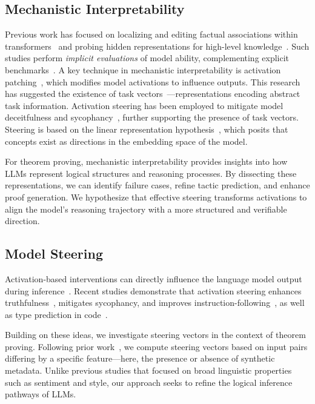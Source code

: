 \subsection{Mechanistic Interpretability}

Previous work has focused on localizing and editing factual associations within transformers~\citep{meng_locating_2022} and probing hidden representations for high-level knowledge~\citep{li2024inference,dong2023probing}. Such studies perform \emph{implicit evaluations} of model ability, complementing explicit benchmarks~\citep{dong2023probing}. A key technique in mechanistic interpretability is activation patching~\citep{vig2020causal,variengien2023look}, which modifies model activations to influence outputs. This research has suggested the existence of task vectors~\citep{hendel2023context, ilharco2022editing}—representations encoding abstract task information. Activation steering has been employed to mitigate model deceitfulness and sycophancy~\citep{rimsky2023steering, li2024inference}, further supporting the presence of task vectors. Steering is based on the linear representation hypothesis~\citep{park2023linear}, which posits that concepts exist as directions in the embedding space of the model. 

For theorem proving, mechanistic interpretability provides insights into how LLMs represent logical structures and reasoning processes. By dissecting these representations, we can identify failure cases, refine tactic prediction, and enhance proof generation. We hypothesize that effective steering transforms activations to align the model’s reasoning trajectory with a more structured and verifiable direction.

\subsection{Model Steering}
Activation-based interventions can directly influence the language model output during inference~\cite{Dathathri-etal, subramani-etal-2022-extracting}. Recent studies demonstrate that activation steering enhances truthfulness~\cite{}, mitigates sycophancy, and improves instruction-following~\cite{stolfo2024improvinginstructionfollowinglanguagemodels}, as well as type prediction in code~\cite{lucchetti2024understandingcodellmsmispredicttypes}.

Building on these ideas, we investigate steering vectors in the context of theorem proving. Following prior work~\cite{burns2024discoveringlatentknowledgelanguage, turner2024steeringlanguagemodelsactivation, arditi2024refusallanguagemodelsmediated, vanderweij2024extendingactivationsteeringbroad}, we compute steering vectors based on input pairs differing by a specific feature—here, the presence or absence of synthetic metadata. Unlike previous studies that focused on broad linguistic properties such as sentiment and style, our approach seeks to refine the logical inference pathways of LLMs.

